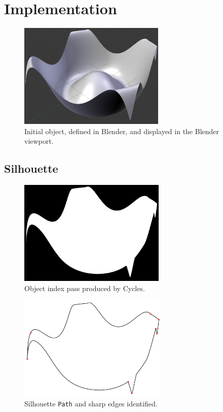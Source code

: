 \chapter{Implementation}\label{appendix_implementation}
\begin{figure}[h!]
	\centering
	\includegraphics[height=5cm]{images/sil_viewport.png}
	\caption{Initial object, defined in Blender, and displayed in the Blender viewport.}\label{sil_viewport}
\end{figure}

\FloatBarrier
\section{Silhouette}\label{impl_silhouette}
\begin{figure}[h!]
	\centering
	\includegraphics[height=5cm]{images/sil_obj.png}
	\caption{Object index pass produced by Cycles.}\label{sil_obj}
\end{figure}

\begin{figure}[h!]
	\centering
	\includegraphics[height=5cm]{images/sil_path_corners.png}
	\caption{Silhouette \texttt{Path} and sharp edges identified.}\label{sil_path_corners}
\end{figure}

